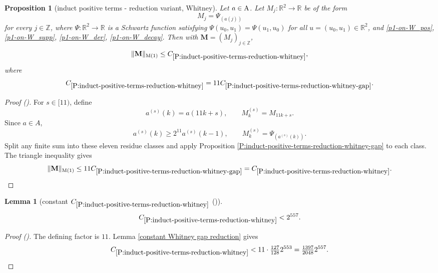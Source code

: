 \documentclass[12pt,reqno]{amsart}
\newcommand{\auto}{{({\tiny\faCar})}}
\theoremstyle{plain}
\newtheorem{lemma}[theorem]{Lemma}
\newtheorem{proposition}[theorem]{Proposition}
\numberwithin{equation}{section}
\theoremstyle{remark}
\newcommand{\uses}[1]{}
\newcommand{\usesdefs}[1]{}
\newcommand{\Z}{{\mathbb Z}}
\newcommand{\M}{\mathbf{M}}
\begin{document}
\begin{proposition}[induct positive terms - reduction variant, Whitney]
\label{P:induct-positive-terms-reduction-whitney}\uses{P:induct-positive-terms-reduction-whitney-gap}\usesdefs{bracket bump,multiplicatively spaced monotone sequences,auto:unitary-matrices-definition,kernel sequences}
Let $a\in {\rm A}$. Let $M_j:\mathbb{R}^2\to \mathbb{R}$ be of the form
\begin{equation}\label{auto:Whitney-kernel}
M_j=\Psi_{(a(j))}
\end{equation}
for every $j\in\Z$, where $\Psi:\mathbb{R}^2\to \mathbb{R}$ is a Schwartz function satisfying $\Psi(u_0,u_1)=\Psi(u_1,u_0)$ for all $u=(u_0,u_1)\in\mathbb{R}^2$, and \eqref{p1-on-W_pos}, \eqref{p1-on-W_supp}, \eqref{p1-on-W_der}, \eqref{p1-on-W_decay}. Then with $\M=(M_j)_{j\in\Z}$,
\begin{equation}\label{auto:Whitney-reduction-bound}
\|\M\|_{\rm M(1)} \le C_{\ref{P:induct-positive-terms-reduction-whitney}},
\end{equation}
where
\begin{equation}\label{auto:Whitney-constant-definition}
C_{\ref{P:induct-positive-terms-reduction-whitney}}
=11C_{\ref{P:induct-positive-terms-reduction-whitney-gap}}.
\end{equation}
\end{proposition}

\begin{proof}[Proof \auto]
For $s\in[11)$, define
\[
a^{(s)}(k)=a(11k+s),
\qquad
M^{(s)}_k=M_{11k+s}.
\]
Since $a\in A$,
\[
a^{(s)}(k)\ge2^{11}a^{(s)}(k-1),
\qquad
M^{(s)}_k=\Psi_{(a^{(s)}(k))}.
\]
Split any finite sum into these eleven residue classes and apply Proposition \ref{P:induct-positive-terms-reduction-whitney-gap} to each class. The triangle inequality gives
\[
\|\M\|_{\rm M(1)}
\le11C_{\ref{P:induct-positive-terms-reduction-whitney-gap}}
= C_{\ref{P:induct-positive-terms-reduction-whitney}}.
\]
\end{proof}

\begin{lemma}[constant $C_{\ref{P:induct-positive-terms-reduction-whitney}}$ \auto]\label{constant Whitney reduction}\uses{constant Whitney gap reduction,P:induct-positive-terms-reduction-whitney}\usesdefs{}
\begin{equation}\label{constant Whitney reduction bound}
C_{\ref{P:induct-positive-terms-reduction-whitney}}
<2^{557}.
\end{equation}
\end{lemma}
\begin{proof}[Proof \auto]
The defining factor is $11$. Lemma \ref{constant Whitney gap reduction} gives
\[
C_{\ref{P:induct-positive-terms-reduction-whitney}}
<11\cdot\tfrac{127}{128}2^{553}
=\tfrac{1397}{2048}2^{557}.
\]
\end{proof}
\end{document}
